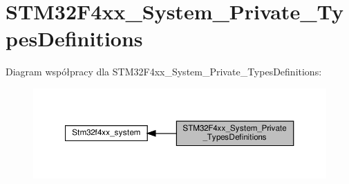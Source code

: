 \hypertarget{group___s_t_m32_f4xx___system___private___types_definitions}{}\section{S\+T\+M32\+F4xx\+\_\+\+System\+\_\+\+Private\+\_\+\+Types\+Definitions}
\label{group___s_t_m32_f4xx___system___private___types_definitions}
Diagram współpracy dla S\+T\+M32\+F4xx\+\_\+\+System\+\_\+\+Private\+\_\+\+Types\+Definitions\+:\nopagebreak
\begin{figure}[H]
\begin{center}
\leavevmode
\includegraphics[width=350pt]{group___s_t_m32_f4xx___system___private___types_definitions}
\end{center}
\end{figure}
